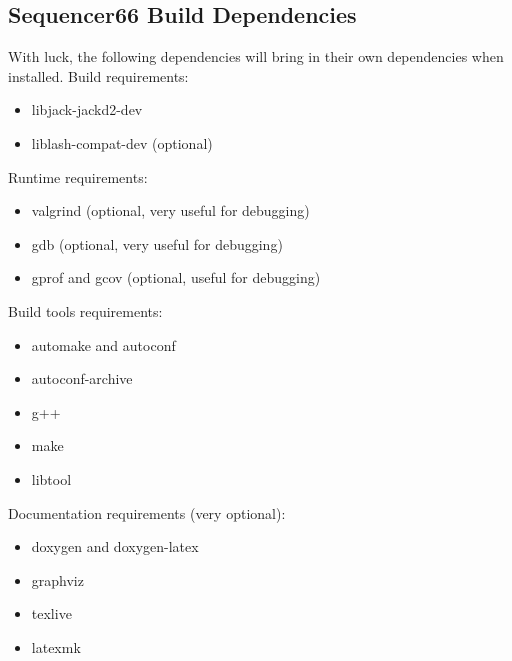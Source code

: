 \subsection{Sequencer66 Build Dependencies}
\label{subsec:seq66_build_dependencies}

   With luck, the following dependencies will bring in their own
   dependencies when installed.  Build requirements:

     \begin{itemize}
        \item libjack-jackd2-dev
        \item liblash-compat-dev (optional)
     \end{itemize}

   Runtime requirements:

     \begin{itemize}
        \item valgrind (optional, very useful for debugging)
        \item gdb (optional, very useful for debugging)
        \item gprof and gcov (optional, useful for debugging)
     \end{itemize}

   Build tools requirements:

     \begin{itemize}
        \item automake and autoconf
        \item autoconf-archive
        \item g++
        \item make
        \item libtool
     \end{itemize}

   Documentation requirements (very optional):

     \begin{itemize}
        \item doxygen and doxygen-latex
        \item graphviz
        \item texlive
        \item latexmk
     \end{itemize}
      
